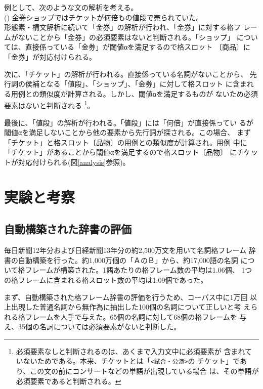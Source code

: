 \documentclass{nlp}
\begin{document}

  例として、次のような文の解析を考える。
  \vspace{1ex}\\
   \hspace{1em}(\theexample)
   金券ショップではチケットが何倍もの値段で売られていた。\vspace{1ex}\\
   形態素・構文解析に続いて「金券」の解析が行われ、「金券」に対する格フ
   レームがないことから「金券」の必須要素はないと判断される。「ショップ」
   については、直接係っている「金券」が閾値αを満足するので格スロット
   〔商品〕に「金券」が対応付けられる。
   
   次に、「チケット」の解析が行われる。直接係っている名詞がないことから、
   先行詞の侯補となる「値段」、「ショップ」、「金券」に対して格スロット
   に含まれる用例との類似度が計算される。しかし、閾値αを満足するものが
   ないため必須要素はないと判断される
   \footnote{必須要素なしと判断されるのは、あくまで入力文中に必須要素が
   含まれていないためである。本来、チケットとは「\texttt{<試合・公演>}の
   チケット」であり、この文の前にコンサートなどの単語が出現している場合
   は、その単語が必須要素であると判断される。}。
   
   最後に、「値段」の解析が行われる。「値段」には「何倍」が直接係ってい
   るが閾値αを満足しないことから他の要素から先行詞が探される。この場合、
   まず「チケット」と格スロット〔品物〕の用例との類似度が計算され。用例
   中に「チケット」があることから閾値αを満足するので格スロット〔品物〕
   にチケットが対応付けられる(図\ref{analysis}参照)。

 \section{実験と考察}
 
  \subsection{自動構築された辞書の評価}
  
  毎日新聞12年分および日経新聞13年分の約2,500万文を用いて名詞格フレーム
  辞書の自動構築を行った。約1,000万個の「ＡのＢ」から、約17,000語の名詞
  について格フレームが構築された。1語あたりの格フレーム数の平均は1.06個、
  1つの格フレームに含まれる格スロット数の平均は1.09個であった。

  まず、自動構築された格フレーム辞書の評価を行うため、コーパス中に1万回
  以上出現した普通名詞から無作為に抽出した100個の名詞について正しいと考
  えられる格フレームを人手で与えた。65個の名詞に対して68個の格フレームを
  与え、35個の名詞については必須要素がないと判断した。
\end{document}
